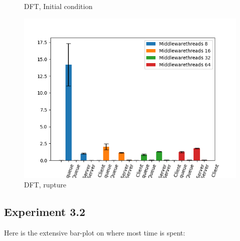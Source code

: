 \documentclass[11pt,a4paper]{article}
\begin{document}
\begin{figure}[!ht]
\begin{minipage}[b]{0.5\linewidth}
    \caption{DFT, Initial condition} 
    \vspace{4ex}
  \end{minipage}%
  \begin{minipage}[b]{0.5\linewidth}
    \centering
    \includegraphics[width=0.7\linewidth]{img/exp3_1/exp3_1_mw_percentile_plots_writes_1__vc_32.png} 
    \caption{DFT, rupture} 
    \vspace{4ex}
  \end{minipage} 
\end{figure}

\subsection{Experiment 3.2}
Here is the extensive bar-plot on where most time is spent:
\end{document}
